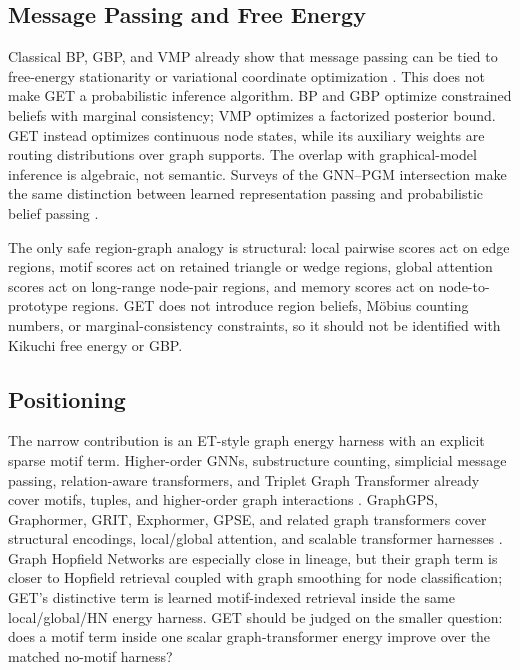 \documentclass[11pt,a4paper]{article}
\begin{document}
\subsection{Message Passing and Free Energy}

Classical BP, GBP, and VMP already show that message passing can be tied to
free-energy stationarity or variational coordinate optimization
\citep{yedidia2005free,winn2005vmp}. This does not make GET a probabilistic
inference algorithm. BP and GBP optimize constrained beliefs with marginal
consistency; VMP optimizes a factorized posterior bound. GET instead optimizes
continuous node states, while its auxiliary weights are routing distributions
over graph supports. The overlap with graphical-model inference is algebraic,
not semantic. Surveys of the GNN--PGM intersection make the same distinction
between learned representation passing and probabilistic belief passing
\citep{hua2022gnnpgm}.

The only safe region-graph analogy is structural: local pairwise scores act on
edge regions, motif scores act on retained triangle or wedge regions, global
attention scores act on long-range node-pair regions, and memory scores act on
node-to-prototype regions. GET does not introduce region beliefs, Möbius
counting numbers, or marginal-consistency constraints, so it should not be
identified with Kikuchi free energy or GBP.

\subsection{Positioning}

The narrow contribution is an ET-style graph energy harness with an explicit
sparse motif term. Higher-order GNNs, substructure counting,
simplicial message passing, relation-aware transformers, and Triplet Graph
Transformer already cover motifs, tuples, and higher-order graph interactions
\citep{morris2019weisfeiler,bouritsas2023subgraph,bodnar2021mpsn,
diao2023relational,hussain2024triplet,burns2023simplicial}. GraphGPS,
Graphormer, GRIT, Exphormer, GPSE, and related graph transformers cover
structural encodings, local/global attention, and scalable transformer
harnesses \citep{ying2021graphormer,rampasek2022gps,ma2023grit,
shirzad2023exphormer,canturk2024gpse,airale2025spse,bao2025homomorphism}.
Graph Hopfield Networks are especially close in lineage, but their graph term is
closer to Hopfield retrieval coupled with graph smoothing for node
classification; GET's distinctive term is learned motif-indexed retrieval inside
the same local/global/HN energy harness.
GET should be judged on the smaller question: does a motif term inside one
scalar graph-transformer energy improve over the matched no-motif harness?
\end{document}
